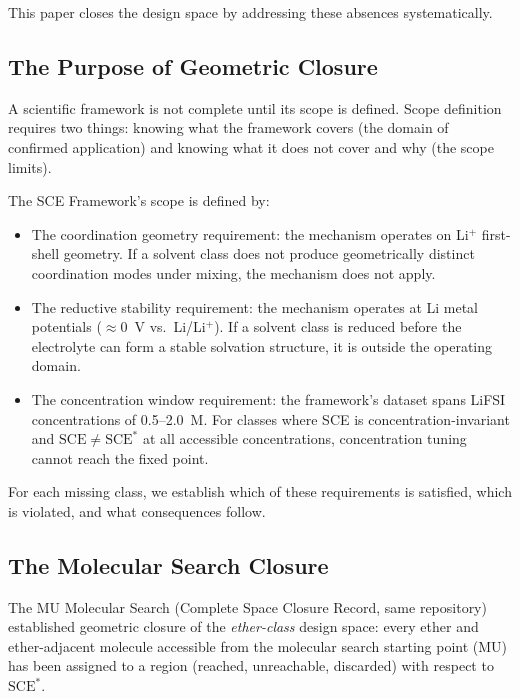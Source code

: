 \documentclass[11pt]{article}
\theoremstyle{plain}
\theoremstyle{definition}
\theoremstyle{remark}
\begin{document}
This paper closes the design space by addressing these absences
systematically.

\subsection{The Purpose of Geometric Closure}

A scientific framework is not complete until its scope is defined.
Scope definition requires two things: knowing what the framework
covers (the domain of confirmed application) and knowing what
it does not cover and why (the scope limits).

The SCE Framework's scope is defined by:
\begin{itemize}[leftmargin=2em]
  \item The coordination geometry requirement: the mechanism
        operates on Li$^+$ first-shell geometry.  If a solvent
        class does not produce geometrically distinct coordination
        modes under mixing, the mechanism does not apply.
  \item The reductive stability requirement: the mechanism
        operates at Li metal potentials ($\approx 0$~V vs.\
        Li/Li$^+$).  If a solvent class is reduced before the
        electrolyte can form a stable solvation structure, it is
        outside the operating domain.
  \item The concentration window requirement: the framework's
        dataset spans LiFSI concentrations of 0.5--2.0~M.  For
        classes where SCE is concentration-invariant and
        $\mathrm{SCE} \neq \mathrm{SCE}^{*}$ at all accessible
        concentrations, concentration tuning cannot reach the
        fixed point.
\end{itemize}

For each missing class, we establish which of these requirements
is satisfied, which is violated, and what consequences follow.

\subsection{The Molecular Search Closure}

The MU Molecular Search (Complete Space Closure Record, same
repository) established geometric closure of the
\emph{ether-class} design space: every ether and ether-adjacent
molecule accessible from the molecular search starting point
(MU) has been assigned to a region (reached, unreachable,
discarded) with respect to $\mathrm{SCE}^{*}$.
\end{document}
